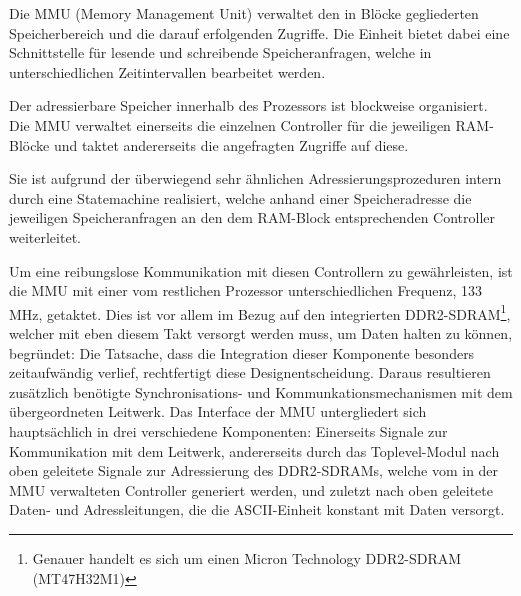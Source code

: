 \label{ch:mmu}

Die MMU (Memory Management Unit) verwaltet den in Bl\"ocke gegliederten Speicherbereich und die darauf erfolgenden Zugriffe. Die Einheit bietet dabei eine Schnittstelle f\"ur lesende und schreibende Speicheranfragen, welche in unterschiedlichen Zeitintervallen bearbeitet werden.


Der adressierbare Speicher innerhalb des Prozessors ist blockweise organisiert. Die MMU verwaltet einerseits die einzelnen Controller f\"ur die jeweiligen RAM-Bl\"ocke und taktet andererseits die angefragten Zugriffe auf diese.

Sie ist aufgrund der \"uberwiegend sehr \"ahnlichen Adressierungsprozeduren intern durch eine Statemachine realisiert, welche anhand einer Speicheradresse die jeweiligen Speicheranfragen an den dem RAM-Block entsprechenden Controller weiterleitet.

Um eine reibungslose Kommunikation mit diesen Controllern zu gew\"ahrleisten, ist die MMU mit einer vom restlichen Prozessor unterschiedlichen Frequenz, 133 MHz, getaktet. Dies ist vor allem im Bezug auf den integrierten DDR2-SDRAM\footnote{Genauer handelt es sich um einen Micron Technology DDR2-SDRAM (MT47H32M1)}, welcher mit eben diesem Takt versorgt werden muss, um Daten halten zu k\"onnen, begr\"undet: Die Tatsache, dass die Integration dieser Komponente besonders zeitaufw\"andig verlief, rechtfertigt diese Designentscheidung. Daraus resultieren zus\"atzlich ben\"otigte Synchronisations- und Kommunkationsmechanismen mit dem \"ubergeordneten Leitwerk.
\newpage
{}
Das Interface der MMU untergliedert sich haupts\"achlich in drei verschiedene Komponenten: Einerseits Signale zur Kommunikation mit dem Leitwerk, andererseits durch das Toplevel-Modul nach oben geleitete Signale zur Adressierung des DDR2-SDRAMs, welche vom in der MMU verwalteten Controller generiert werden, und zuletzt nach oben geleitete Daten- und Adressleitungen, die die ASCII-Einheit konstant mit Daten versorgt.

